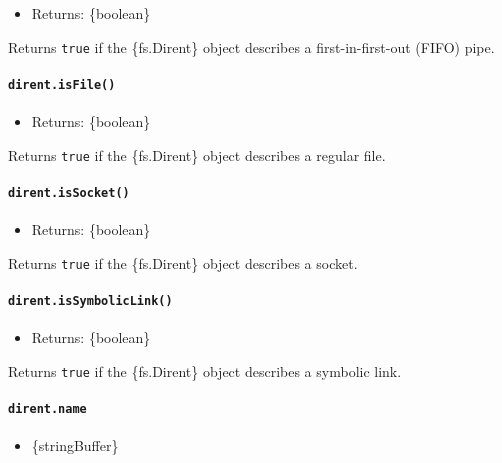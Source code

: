 \begin{itemize}
\tightlist
\item
  Returns: \{boolean\}
\end{itemize}

Returns \texttt{true} if the \{fs.Dirent\} object describes a
first-in-first-out (FIFO) pipe.

\paragraph{\texorpdfstring{\texttt{dirent.isFile()}}{dirent.isFile()}}\label{dirent.isfile}

\begin{itemize}
\tightlist
\item
  Returns: \{boolean\}
\end{itemize}

Returns \texttt{true} if the \{fs.Dirent\} object describes a regular
file.

\paragraph{\texorpdfstring{\texttt{dirent.isSocket()}}{dirent.isSocket()}}\label{dirent.issocket}

\begin{itemize}
\tightlist
\item
  Returns: \{boolean\}
\end{itemize}

Returns \texttt{true} if the \{fs.Dirent\} object describes a socket.

\paragraph{\texorpdfstring{\texttt{dirent.isSymbolicLink()}}{dirent.isSymbolicLink()}}\label{dirent.issymboliclink}

\begin{itemize}
\tightlist
\item
  Returns: \{boolean\}
\end{itemize}

Returns \texttt{true} if the \{fs.Dirent\} object describes a symbolic
link.

\paragraph{\texorpdfstring{\texttt{dirent.name}}{dirent.name}}\label{dirent.name}

\begin{itemize}
\tightlist
\item
  \{string\textbar Buffer\}
\end{itemize}

